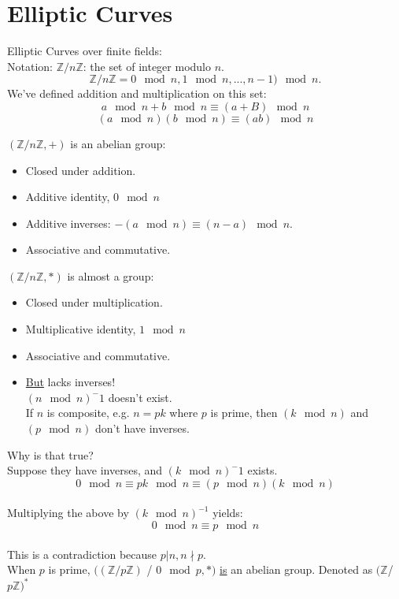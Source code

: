 \section{Elliptic Curves}
Elliptic Curves over finite fields:
\\Notation: $\mathbb{Z} / n \mathbb{Z}$: the set of integer modulo $n$.
$$\mathbb{Z} / n \mathbb{Z}={0\mod{n}, 1\mod{n},..., n-1)\mod{n}}.$$
We've defined addition and multiplication on this set:
$$a\mod{n}+b\mod{n}\equiv(a+B)\mod{n}$$
$$(a\mod{n})(b\mod{n})\equiv(ab)\mod{n}$$

$(\mathbb{Z} / n \mathbb{Z}, +)$ is an abelian group:
\begin{itemize}
\item Closed under addition.
\item Additive identity, $0\mod{n}$
\item Additive inverses: $-(a\mod{n})\equiv(n-a)\mod{n}$.
\item Associative and commutative. 
\end{itemize}

$(\mathbb{Z} / n \mathbb{Z}, *)$ is almost a group:
\begin{itemize}
\item Closed under multiplication.
\item Multiplicative identity, $1\mod{n}$
\item Associative and commutative.
\item \underline{But} lacks inverses!\\
\indent $(n\mod{n})^-1$ doesn't exist.\\
\indent If $n$ is composite, e.g. $n=pk$ where $p$ is prime, then $(k\mod{n})$ and $(p\mod{n})$ don't have inverses.
\end{itemize}

Why is that true?\\
\indent Suppose they have inverses, and $(k\mod{n})^-1$ exists. 
$$0\mod{n}\equiv pk\mod{n} \equiv (p\mod{n})(k\mod{n})$$
\\Multiplying the above by $(k\mod{n})^{-1}$ yields:
$$0\mod{n}\equiv p\mod{n}$$
\\This is a contradiction because $p|n, n\nmid p$.\\

When $p$ is prime, $((\mathbb{Z} / p \mathbb{Z})$ / ${0\mod{p}}, *)$ \underline{is} an abelian group. Denoted as $(\mathbb{Z}$/$p\mathbb{Z})^*$\\

